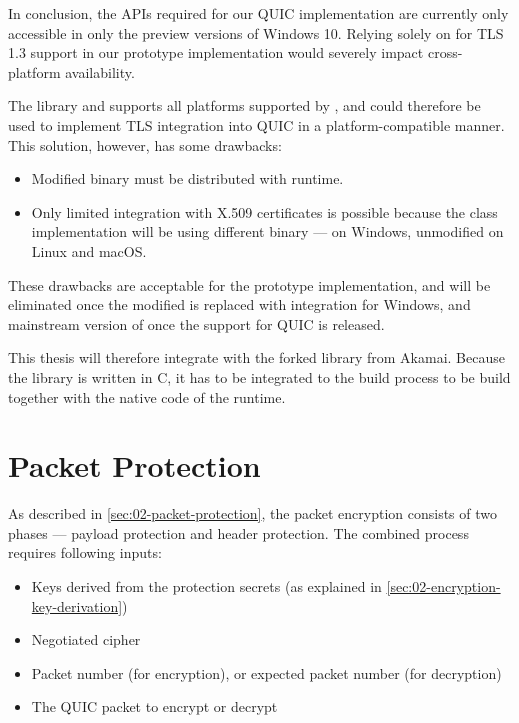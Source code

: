 In conclusion, the APIs required for our QUIC implementation are currently only accessible in only
the preview versions of Windows 10. Relying solely on \libschannel{} for TLS 1.3 support in our
prototype implementation would severely impact cross-platform availability.

The \libopenssl{} library and supports all platforms supported by \dotnet{}, and could therefore be
used to implement TLS integration into QUIC in a platform-compatible manner. This solution, however,
has some drawbacks:

\begin{itemize}

  \item Modified \libopenssl{} binary must be distributed with \dotnet{} runtime.

  \item Only limited integration with X.509 certificates is possible because the
     class implementation will be using different binary ---
     on Windows, unmodified \libopenssl{} on Linux and macOS.

\end{itemize}

These drawbacks are acceptable for the prototype implementation, and will be eliminated once the
modified \libopenssl{} is replaced with \libschannel{} integration for Windows, and mainstream
version of \libopenssl{} once the support for QUIC is released.

This thesis will therefore integrate with the forked \libopenssl{} library from Akamai. Because the
library is written in C, it has to be integrated to the build process to be build together with the
native code of the \dotnet{} runtime.

\section{Packet Protection}

As described in \autoref{sec:02-packet-protection}, the packet encryption consists of two phases ---
payload protection and header protection. The combined process requires following inputs:

\begin{itemize}

  \item Keys derived from the protection secrets (as explained in
  \autoref{sec:02-encryption-key-derivation})

  \item Negotiated cipher

  \item Packet number (for encryption), or expected packet number (for decryption)

  \item The QUIC packet to encrypt or decrypt

\end{itemize}


